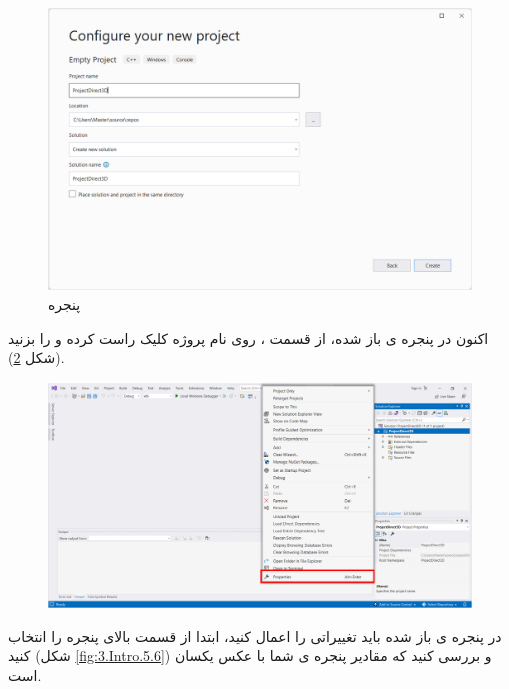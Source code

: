 {\begin{spacing}{1.5}
        \begin{figure}[H]
            \centering
            \setlength{\belowcaptionskip}{-10pt}
            \includegraphics[width=\textwidth]{Images/3/3.Intro.5.4}
            \caption{پنجره }
            \label{fig:3.Intro.5.4}
        \end{figure}

        اکنون در پنجره ی باز شده، از قسمت  ، روی نام پروژه کلیک راست کرده و  را بزنید (شکل \ref{fig:3.Intro.5.5}).

        \begin{figure}[H]
            \centering
            \setlength{\belowcaptionskip}{-10pt}
            \includegraphics[width=\textwidth]{Images/3/3.Intro.5.5}
            \caption{}
            \label{fig:3.Intro.5.5}
        \end{figure}

        در پنجره ی باز شده باید تغییراتی را اعمال کنید،
        ابتدا از قسمت بالای پنجره  را انتخاب کنید (شکل \ref{fig:3.Intro.5.6}) و بررسی کنید که مقادیر پنجره ی شما با عکس یکسان است.


\end{spacing}}
